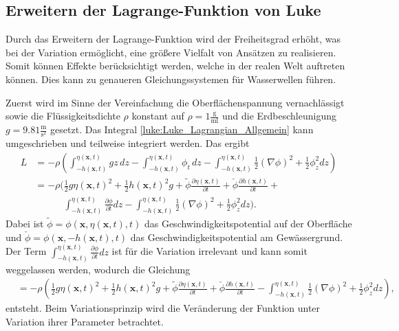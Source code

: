 \subsection{Erweitern der Lagrange-Funktion von Luke
	\label{luke:subsection:Erweitern}}

Durch das Erweitern der Lagrange-Funktion wird der Freiheitsgrad erhöht, was bei der Variation ermöglicht, eine größere Vielfalt von Ansätzen zu realisieren.
Somit können Effekte berücksichtigt werden, welche in der realen Welt auftreten können. Dies kann zu genaueren Gleichungssystemen für Wasserwellen führen.

Zuerst wird im Sinne der Vereinfachung die Oberflächenspannung vernachlässigt sowie die Flüssigkeitsdichte $\rho$ konstant auf $\rho = 1\frac{\text{g}}{\text{ml}}$ und die Erdbeschleunigung $g = 9.81\frac{\text{m}}{\text{s}^2}$ gesetzt.
Das Integral \eqref{luke:Luke_Lagrangian_Allgemein} kann umgeschrieben und teilweise integriert werden. 
Das ergibt
\begin{align*}
	L
	&=
	-\rho\left(\int_{-h(\bm{x},t)}^{\eta(\bm{x},t)} g z\, dz - \int_{-h(\bm{x},t)}^{\eta(\bm{x},t)} \phi_t\, dz -\int_{-h(\bm{x},t)}^{\eta(\bm{x},t)} \frac{1}{2}\left(\nabla\phi\right)^2 + \frac{1}{2}\phi_z^2 dz\right)
	\\
	&=
	-\rho\Bigg(\frac{1}{2}g\eta(\bm{x},t)^2 + \frac{1}{2}h(\bm{x},t)^2g +\tilde{\phi} \frac{\partial\eta(\bm{x},t)}{\partial t} + \check{\phi} \frac{\partial h(\bm{x},t)}{\partial t} + \\ &\qquad\quad\int_{-h(\bm{x},t)}^{\eta(\bm{x},t)} \frac{\partial \phi}{\partial t}dz
	-\int_{-h(\bm{x},t)}^{\eta(\bm{x},t)} \frac{1}{2}\left(\nabla\phi\right)^2 + \frac{1}{2}\phi_z^2 dz\Bigg).
\end{align*}
Dabei ist $\tilde{\phi} = \phi(\bm{x},\eta(\bm{x},t),t)$ das Geschwindigkeitspotential auf der Oberfläche und $\check{\phi} = \phi(\bm{x},-h(\bm{x},t),t)$ das Geschwindigkeitspotential am Gewässergrund.
Der Term $\int_{-h(\bm{x},t)}^{\eta(\bm{x},t)} \frac{\partial \phi}{\partial t}dz$ ist für die Variation irrelevant und kann somit weggelassen werden, wodurch die Gleichung
\begin{align*}
	&=
	-\rho\left(\frac{1}{2}g\eta(\bm{x},t)^2 + \frac{1}{2}h(\bm{x},t)^2g +\tilde{\phi} \frac{\partial\eta(\bm{x},t)}{\partial t} + \check{\phi} \frac{\partial h(\bm{x},t)}{\partial t}-\int_{-h(\bm{x},t)}^{\eta(\bm{x},t)} \frac{1}{2}\left(\nabla\phi\right)^2 + \frac{1}{2}\phi_z^2 dz\right),
\end{align*}
entsteht.
Beim Variationsprinzip wird die Veränderung der Funktion unter Variation ihrer Parameter betrachtet.
